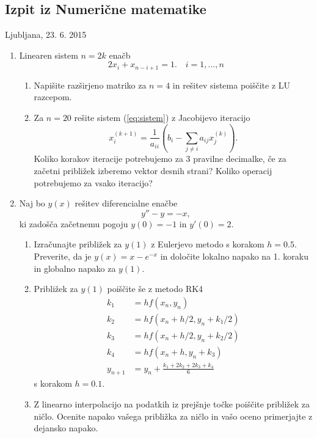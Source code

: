 \documentclass[slovene]{article}
\begin{document}
\begin{center}
\section*{Izpit iz Numerične matematike}

Ljubljana, 23. 6. 2015
\end{center}
\pagestyle{empty}

\begin{enumerate}
\item Linearen sistem $n=2k$ enačb
  \begin{equation}
    \label{eq:sistem}
    2x_i+x_{n-i+1}=1.\quad i=1,\ldots,n
  \end{equation}
  \begin{enumerate}
  \item Napišite razširjeno matriko za $n=4$ in rešitev sistema poiščite z LU razcepom.
  \item Za $n=20$ rešite sistem (\ref{eq:sistem}) z Jacobijevo iteracijo
      \begin{equation*}
        \label{eq:Jacobi}
        x_i^{(k+1)} = \frac{1}{a_{ii}}\left(b_i-\sum_{j\not= i}a_{ij}x_j^{(k)}\right).
      \end{equation*}
Koliko korakov iteracije potrebujemo za 3 pravilne decimalke, če za začetni približek izberemo vektor desnih strani? Koliko operacij potrebujemo za vsako iteracijo? 
  \end{enumerate}

\item Naj bo $y(x)$ rešitev diferencialne enačbe
  \begin{equation*}
    \label{eq:NDE}
    y''-y=-x,
  \end{equation*}
ki zadošča začetnemu pogoju $y(0)=-1$ in $y'(0)=2$.
\begin{enumerate}
\item Izračunajte približek za $y(1)$ z Eulerjevo metodo s korakom $h=0.5$. Preverite, da je $y(x)=x-e^{-x}$ in določite lokalno napako na 1. koraku in globalno napako za $y(1)$.
\item Približek za $y(1)$ poiščite še z metodo RK4 
  \begin{align*}
    k_1&=h f(x_n,y_n)\\
    k_2&=h f(x_n+h/2,y_n+k_1/2)\\
    k_3&=h f(x_n+h/2,y_n+k_2/2)\\
    k_4&=h f(x_n+h,y_n+k_3)\\
    y_{n+1}&=y_n+\frac{k_1+2k_2+2k_3+k_4}{6}
  \end{align*}
s korakom $h=0.1$.
\item Z linearno interpolacijo na podatkih iz prejšnje točke poiščite približek za ničlo. Ocenite napako vašega približka za ničlo in vašo oceno primerjajte z dejansko napako.
\end{enumerate}
\end{enumerate}
\end{document}
